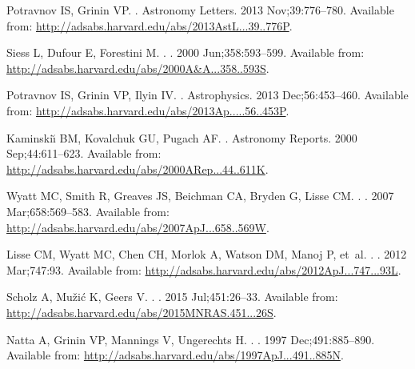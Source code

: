 \documentclass[]{rsos}
\begin{document}
\begin{thebibliography}{10}
{Potravnov} IS, {Grinin} VP.
.
\newblock Astronomy Letters. 2013 Nov;39:776--780.
\newblock Available from:
  \url{http://adsabs.harvard.edu/abs/2013AstL...39..776P}.

{Siess} L, {Dufour} E, {Forestini} M.
.
\newblock \aap. 2000 Jun;358:593--599.
\newblock Available from:
  \url{http://adsabs.harvard.edu/abs/2000A&A...358..593S}.

{Potravnov} IS, {Grinin} VP, {Ilyin} IV.
.
\newblock Astrophysics. 2013 Dec;56:453--460.
\newblock Available from:
  \url{http://adsabs.harvard.edu/abs/2013Ap.....56..453P}.

{Kaminski{\u \i}} BM, {Kovalchuk} GU, {Pugach} AF.
.
\newblock Astronomy Reports. 2000 Sep;44:611--623.
\newblock Available from:
  \url{http://adsabs.harvard.edu/abs/2000ARep...44..611K}.

{Wyatt} MC, {Smith} R, {Greaves} JS, {Beichman} CA, {Bryden} G, {Lisse} CM.
.
\newblock \apj. 2007 Mar;658:569--583.
\newblock Available from:
  \url{http://adsabs.harvard.edu/abs/2007ApJ...658..569W}.

{Lisse} CM, {Wyatt} MC, {Chen} CH, {Morlok} A, {Watson} DM, {Manoj} P, et~al.
.
\newblock \apj. 2012 Mar;747:93.
\newblock Available from:
  \url{http://adsabs.harvard.edu/abs/2012ApJ...747...93L}.

{Scholz} A, {Mu{\v z}i{\'c}} K, {Geers} V.
.
\newblock \mnras. 2015 Jul;451:26--33.
\newblock Available from:
  \url{http://adsabs.harvard.edu/abs/2015MNRAS.451...26S}.

{Natta} A, {Grinin} VP, {Mannings} V, {Ungerechts} H.
.
\newblock \apj. 1997 Dec;491:885--890.
\newblock Available from:
  \url{http://adsabs.harvard.edu/abs/1997ApJ...491..885N}.


\end{thebibliography}
\end{document}
